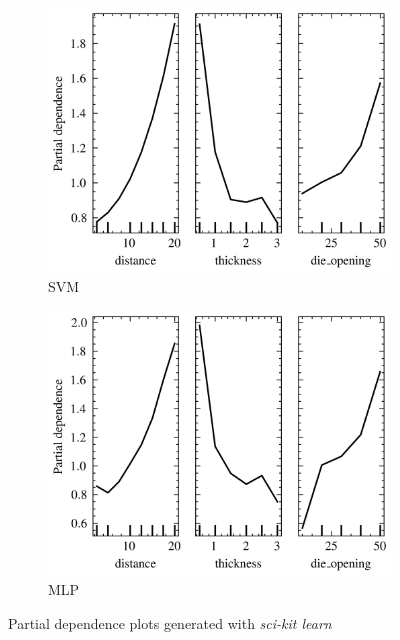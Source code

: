 \begin{figure}[h]
    \begin{tcolorbox}[arc=0pt,boxrule=0.5pt]
        \centering
        \begin{subfigure}{0.45\textwidth}
            \includegraphics[width=\textwidth]{chap5/images/partial_dependence_SVM}
            \caption{SVM}
            \label{fig:feature_impoartances_rf}
        \end{subfigure}
        \hfill
        \begin{subfigure}{0.45\textwidth}
            \includegraphics[width=\textwidth]{chap5/images/partial_dependence_MLP}
            \caption{MLP}
            \label{fig:partial_dependence_svm}
        \end{subfigure}
        \hfill
    \end{tcolorbox}
    \caption{Partial dependence plots generated with \textit{sci-kit learn}~\cite{scikit-learn}}
    \label{fig:partial_dependence_plots}
\end{figure}

